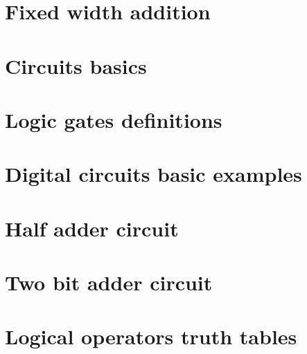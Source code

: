 
\section*{Fixed width addition}

\vfill
\section*{Circuits basics}

\vfill
\section*{Logic gates definitions}

\vfill
\section*{Digital circuits basic examples}

\vfill
\section*{Half adder circuit}

\vfill
\section*{Two bit adder circuit}

\vfill
\section*{Logical operators truth tables}

\vfill
